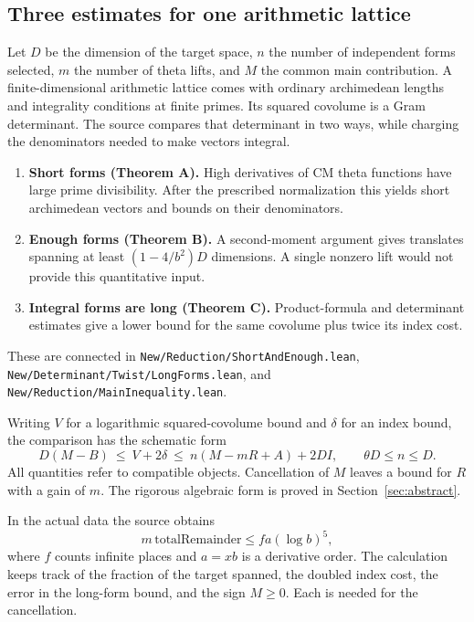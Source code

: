 \documentclass[11pt,letterpaper]{article}
\theoremstyle{definition}\newtheorem{definition}[theorem]{Definition}
\theoremstyle{remark}\newtheorem{remark}[theorem]{Remark}
\newcommand{\src}[1]{\nolinkurl{#1}}
\begin{document}
\subsection{Three estimates for one arithmetic lattice}
Let $D$ be the dimension of the target space, $n$ the number of independent forms selected,
$m$ the number of theta lifts, and $M$ the common main contribution. A finite-dimensional
arithmetic lattice comes with ordinary archimedean lengths and integrality conditions at finite
primes. Its squared covolume is a Gram determinant. The source compares that determinant
in two ways, while charging the denominators needed to make vectors integral.

\begin{enumerate}
\item \textbf{Short forms (Theorem A).} High derivatives of CM theta functions have
large prime divisibility. After the prescribed normalization this yields short archimedean
vectors and bounds on their denominators.
\item \textbf{Enough forms (Theorem B).} A second-moment argument gives translates spanning
at least $(1-4/b^2)D$ dimensions. A single nonzero lift would not provide this quantitative input.
\item \textbf{Integral forms are long (Theorem C).} Product-formula and determinant estimates
give a lower bound for the same covolume plus twice its index cost.
\end{enumerate}
These are connected in \src{New/Reduction/ShortAndEnough.lean},
\src{New/Determinant/Twist/LongForms.lean}, and
\src{New/Reduction/MainInequality.lean}.\cite{shortenough,longforms,mainineq}

Writing $V$ for a logarithmic squared-covolume bound and $\delta$ for an index bound,
the comparison has the schematic form
\begin{equation}\label{eq:sandwich}
 D(M-B)\ \le\ V+2\delta\ \le\ n(M-mR+A)+2DI,
 \qquad \theta D\le n\le D.
\end{equation}
All quantities refer to compatible objects. Cancellation of $M$ leaves a bound for $R$
with a gain of $m$. The rigorous algebraic form is proved in Section~\ref{sec:abstract}.

In the actual data the source obtains
\begin{equation}\label{eq:star}
 m\,\mathrm{totalRemainder}\le f a(\log b)^5,
\end{equation}
where $f$ counts infinite places and $a=xb$ is a derivative order. The calculation keeps track
of the fraction of the target spanned, the doubled index cost, the error in the long-form bound,
and the sign $M\ge0$. Each is needed for the cancellation.\cite{mainineq}
\end{document}
